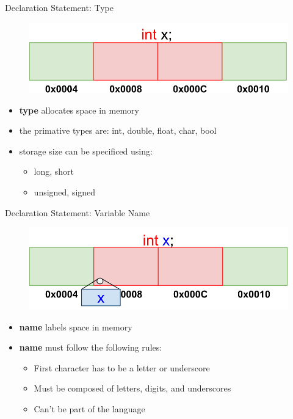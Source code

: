 \documentclass[xcolor={dvipsnames}]{beamer}
\begin{document}
\begin{frame}{Declaration Statement: Type}

\begin{figure}
	\includegraphics[width=1\textwidth]{dtype}
\end{figure}

\begin{block}{}
\begin{itemize}
	\item \textbf{type} allocates space in memory
	\item the primative types are: int, double, float, char, bool
	\item storage size can be specificed using: 
		\begin{itemize}
			\item long, short
			\item unsigned, signed
		\end{itemize}
\end{itemize}
\end{block}

\end{frame}

\begin{frame}{Declaration Statement: Variable Name}

\begin{figure}
	\includegraphics[width=1\textwidth]{label}
\end{figure}

\begin{block}{}
	\begin{itemize}
	 \item \textbf{name} labels space in memory
	\item \textbf{name} must follow the following rules:
		\begin{itemize}	
			\item First character has to be a letter or underscore
			\item Must be composed of letters, digits, and underscores
			\item Can't be part of the language	
		\end{itemize}
	\end{itemize}
\end{block}
\end{frame}
\end{document}
